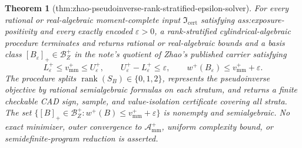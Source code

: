 \documentclass{article}
\newtheorem{theorem}{Theorem}
\begin{document}
\begin{theorem}[thm:zhao-pseudoinverse-rank-stratified-epsilon-solver]\label{thm:zhao-pseudoinverse-rank-stratified-epsilon-solver}
For every rational or real-algebraic moment-complete input \(\mathfrak I_{\mathrm{cert}}\) satisfying ass:exposure-positivity and every exactly encoded \(\varepsilon>0\), a rank-stratified cylindrical-algebraic procedure terminates and returns rational or real-algebraic bounds and a basis class \([B_\varepsilon]_+\in\mathcal B_Z^+\) in the note's quotient of Zhao's published carrier satisfying
\[
L_\varepsilon^+\le v_{\mathrm{mm}}^+\le U_\varepsilon^+,
\qquad U_\varepsilon^+-L_\varepsilon^+\le\varepsilon,
\qquad w^+(B_\varepsilon)\le v_{\mathrm{mm}}^++\varepsilon.
\]
The procedure splits \(\operatorname{rank}(S_B)\in\{0,1,2\}\), represents the pseudoinverse objective by rational semialgebraic formulas on each stratum, and returns a finite checkable CAD sign, sample, and value-isolation certificate covering all strata.  The set \(\{[B]_+\in\mathcal B_Z^+:w^+(B)\le v_{\mathrm{mm}}^++\varepsilon\}\) is nonempty and semialgebraic.  No exact minimizer, outer convergence to \(\mathcal A_{\mathrm{mm}}^+\), uniform complexity bound, or semidefinite-program reduction is asserted.
\end{theorem}
\end{document}
